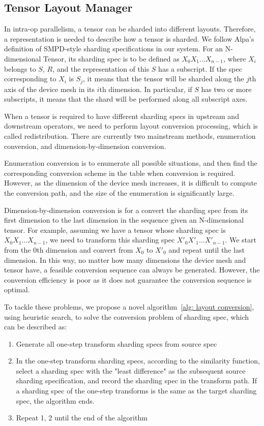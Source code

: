 \subsection{Tensor Layout Manager}

In intra-op parallelism, a tensor can be sharded into different layouts. Therefore, a representation is needed to describe how a tensor is sharded. We follow Alpa's definition of SMPD-style sharding specifications in our system.
For an N-dimensional Tensor, its sharding spec is to be defined as $X_0X_1...X_{n-1}$, where $X_i$ belongs to {$S$, $R$}, and the representation of this $S$ has a subscript.
If the spec corresponding to $X_i$ is $S_j$, it means that the tensor will be sharded along the $j$th axis of the device mesh in its $i$th dimension. 
In particular, if $S$ has two or more subscripts, it means that the shard will be performed along all subscript axes.

When a tensor is required to have different sharding specs in upstream and downstream operators, we need to perform layout conversion processing, which is called redistribution. There are currently two mainstream methods, enumeration conversion, and dimension-by-dimension conversion. 

Enumeration conversion is to enumerate all possible situations, and then find the corresponding conversion scheme in the table when conversion is required.
However, as the dimension of the device mesh increases, it is difficult to compute the conversion path, and the size of the enumeration is significantly large. 

Dimension-by-dimension conversion is for a convert the sharding spec from its first dimension to the last dimension in the sequence given an N-dimensional tensor. For example, assuming we have a tensor whose sharding spec is $X_0X_1...X_{n-1}$, we need to transform this sharding spec $X'_0X'_1...X'_{n-1}$. We start from the 0th dimension and convert from $X_0$ to $X'_0$ and repeat until the last dimension. In this way, no matter how many dimensions the device mesh and tensor have, a feasible conversion sequence can always be generated. However, the conversion efficiency is poor as it does not guarantee the conversion sequence is optimal.

To tackle these problems, we propose a novel algorithm~\ref{alg: layout conversion}, using heuristic search, to solve the conversion problem of sharding spec, which can be described as:
\begin{enumerate}
    \item Generate all one-step transform sharding specs from source spec
    \item In the one-step transform sharding specs, according to the similarity function, select a sharding spec with the "least difference" as the subsequent source sharding specification, and record the sharding spec in the transform path. If a sharding spec of the one-step transforms is the same as the target sharding spec, the algorithm ends.
    \item Repeat 1, 2 until the end of the algorithm
\end{enumerate}

